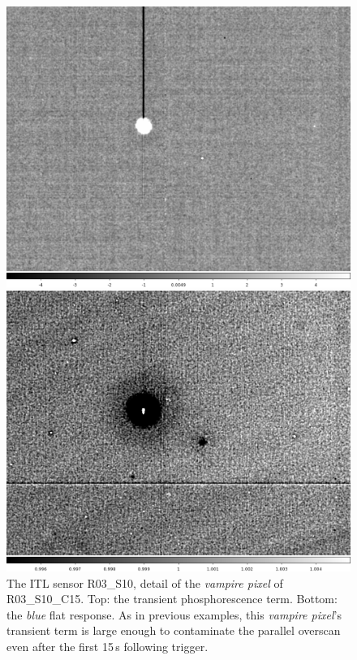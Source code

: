 \begin{figure}[!htbp]
\centering
\begin{minipage}{1.0\textwidth}    
  \centering
  \includegraphics[width=.6\linewidth]{figures/phosphorescence-survey/stains_phos_R03_S10.png}    
\end{minipage}
\begin{minipage}{1.0\textwidth}
  \centering
  \includegraphics[width=.6\linewidth]{figures/phosphorescence-survey/stains_abs_R03_S10.png}
\end{minipage}
\caption{The ITL sensor R03\_S10, detail of the {\it vampire pixel} of R03\_S10\_C15. Top: the transient phosphorescence term. Bottom: the {\it blue} flat response. As in previous examples, this {\it vampire pixel}'s transient term is large enough to contaminate the parallel overscan even after the first 15\,s following trigger.}
\label{fig:phos:stains:R03S10}
\end{figure}


